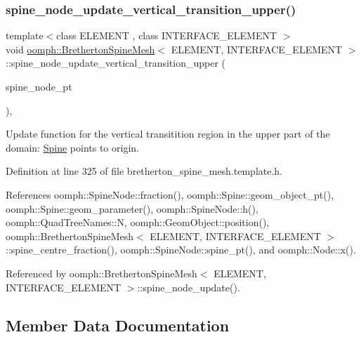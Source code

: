 \subsubsection{\texorpdfstring{spine\+\_\+node\+\_\+update\+\_\+vertical\+\_\+transition\+\_\+upper()}{spine\_node\_update\_vertical\_transition\_upper()}}
{\footnotesize\ttfamily template$<$class E\+L\+E\+M\+E\+NT , class I\+N\+T\+E\+R\+F\+A\+C\+E\+\_\+\+E\+L\+E\+M\+E\+NT $>$ \\
void \hyperlink{classoomph_1_1BrethertonSpineMesh}{oomph\+::\+Bretherton\+Spine\+Mesh}$<$ E\+L\+E\+M\+E\+NT, I\+N\+T\+E\+R\+F\+A\+C\+E\+\_\+\+E\+L\+E\+M\+E\+NT $>$\+::spine\+\_\+node\+\_\+update\+\_\+vertical\+\_\+transition\+\_\+upper (\begin{DoxyParamCaption}\item[{\hyperlink{classoomph_1_1SpineNode}{Spine\+Node} $\ast$}]{spine\+\_\+node\+\_\+pt }\end{DoxyParamCaption})\hspace{0.3cm}{\ttfamily [inline]}, {\ttfamily [protected]}}



Update function for the vertical transitition region in the upper part of the domain\+: \hyperlink{classoomph_1_1Spine}{Spine} points to origin. 



Definition at line 325 of file bretherton\+\_\+spine\+\_\+mesh.\+template.\+h.



References oomph\+::\+Spine\+Node\+::fraction(), oomph\+::\+Spine\+::geom\+\_\+object\+\_\+pt(), oomph\+::\+Spine\+::geom\+\_\+parameter(), oomph\+::\+Spine\+Node\+::h(), oomph\+::\+Quad\+Tree\+Names\+::N, oomph\+::\+Geom\+Object\+::position(), oomph\+::\+Bretherton\+Spine\+Mesh$<$ E\+L\+E\+M\+E\+N\+T, I\+N\+T\+E\+R\+F\+A\+C\+E\+\_\+\+E\+L\+E\+M\+E\+N\+T $>$\+::spine\+\_\+centre\+\_\+fraction(), oomph\+::\+Spine\+Node\+::spine\+\_\+pt(), and oomph\+::\+Node\+::x().



Referenced by oomph\+::\+Bretherton\+Spine\+Mesh$<$ E\+L\+E\+M\+E\+N\+T, I\+N\+T\+E\+R\+F\+A\+C\+E\+\_\+\+E\+L\+E\+M\+E\+N\+T $>$\+::spine\+\_\+node\+\_\+update().



\subsection{Member Data Documentation}
\mbox{\label{classoomph_1_1BrethertonSpineMesh_aeb4fa323886ed601b1497777f8e686bc}} 

